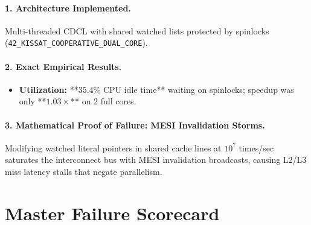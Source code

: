 \documentclass[11pt]{article}
\theoremstyle{definition}
\begin{document}
\paragraph{1. Architecture Implemented.}
Multi-threaded CDCL with shared watched lists protected by spinlocks (\texttt{42_KISSAT_COOPERATIVE_DUAL_CORE}).

\paragraph{2. Exact Empirical Results.}
\begin{itemize}
    \item \textbf{Utilization:} **$35.4\%$ CPU idle time** waiting on spinlocks; speedup was only **$1.03\times$** on 2 full cores.
\end{itemize}

\paragraph{3. Mathematical Proof of Failure: MESI Invalidation Storms.}
Modifying watched literal pointers in shared cache lines at $10^7$ times/sec saturates the interconnect bus with MESI invalidation broadcasts, causing L2/L3 miss latency stalls that negate parallelism.

\newpage
\section{Master Failure Scorecard}
\end{document}
